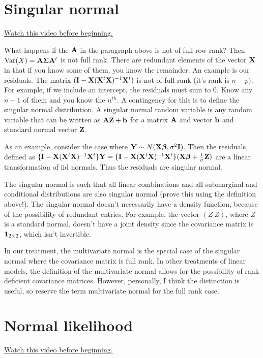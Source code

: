 \section{Singular normal}
\href{https://www.youtube.com/watch?v=JGoX7lokhyc&index=45&list=PLpl-gQkQivXhdgUCdaUQcdb31CRe8Mm2y}{Watch this video before beginning.}

What happens if the $\mathbf{A}$ in the paragraph above is not of full
row rank? Then $\mbox{Var}(X) = \mathbf{A}\boldsymbol{\Sigma} \mathbf{A}^t$ is not full rank.
There are redundant elements of the vector $\mathbf{X}$ in that if
you know some of them, you know the remainder. An example is
our residuals. The matrix $(\mathbf{I} - \mathbf{X} (\mathbf{X}^t \mathbf{X})^{-1} \mathbf{X}^t)$ is not of full
rank (it's rank is $n-p$). For example, if we include an
intercept, the residuals must sum to 0. Know any $n-1$ of
them and you know the $n^{th}$. A contingency for this
is to define the singular normal distribution. A
singular normal random variable is any random variable
that can be written as $\mathbf{A} \mathbf{Z} + \mathbf{b}$ for a matrix $\mathbf{A}$
and vector $\mathbf{b}$ and standard normal vector $\mathbf{Z}$. 

As an example, consider the case where $\mathbf{Y} \sim N(\mathbf{X} \boldsymbol{\beta}, \sigma^2 \mathbf{I})$.
Then the residuals, defined as $\{\mathbf{I} - \mathbf{X} (\mathbf{X}^t \mathbf{X})^{-1} \mathbf{X}^t\} \mathbf{Y} = \{\mathbf{I} - \mathbf{X} (\mathbf{X}^t \mathbf{X})^{-1} \mathbf{X}^t\}(\mathbf{X}\boldsymbol{\beta} + \frac{1}{\sigma} \mathbf{Z})$
are a linear transformation of iid normals. Thus the residuals are singular normal. 

The singular normal is such that all linear combinations and all submarginal and conditional distributions
are also singular normal (prove this using the definition above!). The singular normal doesn't necessarily
have a density function, because of the possibility of redundant
entries. For example, the vector $(Z ~ Z)$, where $Z$ is a standard normal,
doesn't have a joint density since the covariance matrix is $\mathbf{1}_{2\times 2}$,
which isn't invertible.

In our treatment, the multivariate normal is the special case of the singular normal where the covariance matrix is full rank. In other treatments of linear models,
the definition of the
multivariate normal allows for the possibility of rank deficient covariance matrices. However, personally, I think the distinction is useful, so reserve
the term multivariate normal for the full rank case.

\section{Normal likelihood}

\href{https://www.youtube.com/watch?v=HqlMCQwvjYw&list=PLpl-gQkQivXhdgUCdaUQcdb31CRe8Mm2y&index=46}{Watch this video before beginning.}

